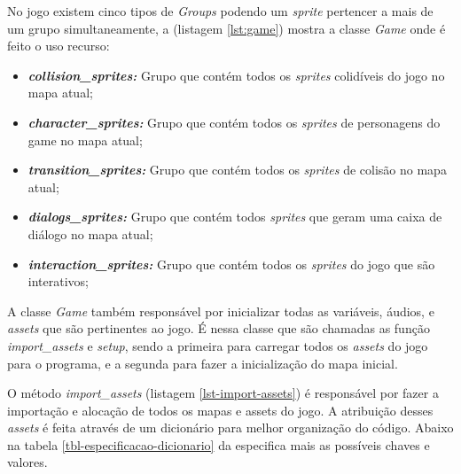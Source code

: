 % 


No jogo existem cinco tipos de \textit{Groups} podendo um \textit{sprite} pertencer a mais de um grupo simultaneamente, a (listagem \ref{lst:game}) mostra a classe \textit{Game} onde é feito o uso recurso:
\begin{itemize}
    \item \textit{\textbf{collision\_sprites: }}Grupo que contém todos os \textit{sprites} colidíveis do jogo no mapa atual;
    \item \textit{\textbf{character\_sprites: }}Grupo que contém todos os \textit{sprites} de personagens do game no mapa atual;
    \item \textit{\textbf{transition\_sprites: }}Grupo que contém todos os \textit{sprites} de colisão no mapa atual;
    \item \textit{\textbf{dialogs\_sprites: }}Grupo que contém todos \textit{sprites} que geram uma caixa de diálogo no mapa atual;
    \item \textit{\textbf{interaction\_sprites: }}Grupo que contém todos os \textit{sprites} do jogo que são interativos;
\end{itemize}

A classe \textit{Game} também responsável por inicializar todas as variáveis, áudios, e \textit{assets} que são pertinentes ao jogo. É nessa classe que são chamadas as função \textit{import\_assets} e \textit{setup}, sendo a primeira para carregar todos os \textit{assets} do jogo para o programa, e a segunda para fazer a inicialização do mapa inicial. 




\clearpage
O método \textit{import\_assets} (listagem \ref{lst-import-assets}) é responsável por fazer a importação e alocação de todos os mapas e assets do jogo. A atribuição desses \textit{assets} é feita através de um dicionário para melhor organização do código. Abaixo na tabela \ref{tbl-especificacao-dicionario} da especifica mais as possíveis chaves e valores.


